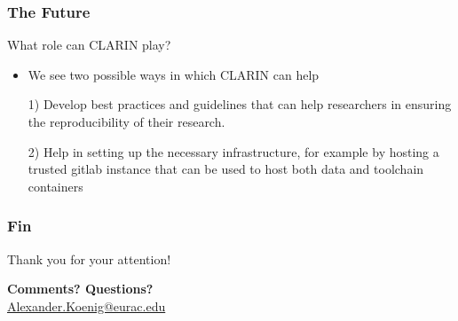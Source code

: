 \documentclass[]{beamer}
\begin{document}
	\begin{frame}
		\frametitle{The Future}
		\begin{block}{What role can CLARIN play?}
			\begin{itemize}
				\item We see two possible ways in which CLARIN can help
				\pause
				\item[1)] Develop best practices and guidelines that can help researchers in ensuring the reproducibility of their research.
				\pause
				\item[2)] Help in setting up the necessary infrastructure, for example by hosting a trusted gitlab instance that can be used to host both data and toolchain containers
			\end{itemize}
		\end{block}
	\end{frame}

	\begin{frame}
			\frametitle{Fin}
			\begin{block}{Thank you for your attention!}
			\begin{center}
					\bigskip
					\bigskip
					\textbf{Comments? Questions?}
					\\[2\baselineskip]
					\url{Alexander.Koenig@eurac.edu}
			\end{center}
			\end{block}
	\end{frame}



%
%
%
%
%
%
%
%
%
\end{document}
